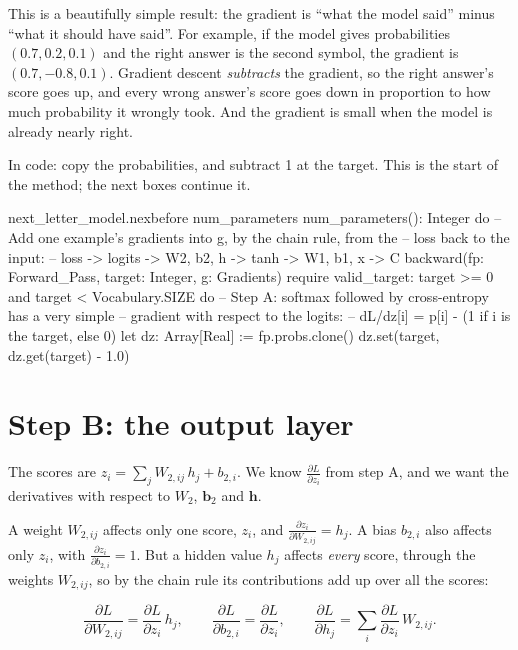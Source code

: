 \documentclass[11pt,a4paper,oneside,openany]{book}
\newcommand{\code}[1]{\texttt{\detokenize{#1}}}
\newcommand{\vect}[1]{\mathbf{#1}}
\newcommand{\pd}[2]{\frac{\partial #1}{\partial #2}}
\begin{document}
This is a beautifully simple result: the gradient is ``what the model
said'' minus ``what it should have said''. For example, if the model gives
probabilities $(0.7, 0.2, 0.1)$ and the right answer is the second symbol,
the gradient is $(0.7, -0.8, 0.1)$. Gradient descent \emph{subtracts} the
gradient, so the right answer's score goes up, and every wrong answer's
score goes down in proportion to how much probability it wrongly took. And
the gradient is small when the model is already nearly right.

In code: copy the probabilities, and subtract 1 at the target. This is the
start of the \code{backward} method; the next boxes continue it.

\begin{addbefore}{next_letter_model.nex}{before num_parameters}{  num_parameters(): Integer do}
  -- Add one example's gradients into g, by the chain rule, from the
  -- loss back to the input:
  --   loss -> logits -> W2, b2, h -> tanh -> W1, b1, x -> C
  backward(fp: Forward_Pass, target: Integer, g: Gradients)
  require
    valid_target: target >= 0 and target < Vocabulary.SIZE
  do
    -- Step A: softmax followed by cross-entropy has a very simple
    -- gradient with respect to the logits:
    --     dL/dz[i] = p[i] - (1 if i is the target, else 0)
    let dz: Array[Real] := fp.probs.clone()
    dz.set(target, dz.get(target) - 1.0)
\end{addbefore}

\section{Step B: the output layer}

The scores are $z_i = \sum_j W_{2,ij}\,h_j + b_{2,i}$. We know
$\pd{L}{z_i}$ from step A, and we want the derivatives with respect to
$W_2$, $\vect{b}_2$ and $\vect{h}$.

A weight $W_{2,ij}$ affects only one score, $z_i$, and
$\pd{z_i}{W_{2,ij}} = h_j$. A bias $b_{2,i}$ also affects only $z_i$,
with $\pd{z_i}{b_{2,i}} = 1$. But a hidden value $h_j$ affects
\emph{every} score, through the weights $W_{2,ij}$, so by the chain rule
its contributions add up over all the scores:

\begin{mathbox}[Step B, and the same for any layer $\vect{z} = W\vect{h} + \vect{b}$]
\[
  \pd{L}{W_{2,ij}} = \pd{L}{z_i}\,h_j, \qquad
  \pd{L}{b_{2,i}} = \pd{L}{z_i}, \qquad
  \pd{L}{h_j} = \sum_i \pd{L}{z_i}\,W_{2,ij} .
\]
\end{mathbox}
\end{document}

